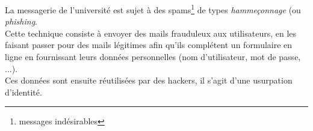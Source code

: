 La messagerie de l'université est sujet à des spams\footnote{messages 
indésirables} de types \emph{hammeçonnage} (ou \emph{phishing}. \\

Cette technique consiste à envoyer des mails frauduleux aux 
utilisateurs, en les faisant passer pour des mails légitimes afin
qu'ils complétent un formulaire en ligne en fournissant leurs données 
personnelles (nom d'utilisateur, mot de passe, ...).\\
Ces données sont ensuite réutilisées par des hackers, il s'agit d'une 
usurpation d'identité.
